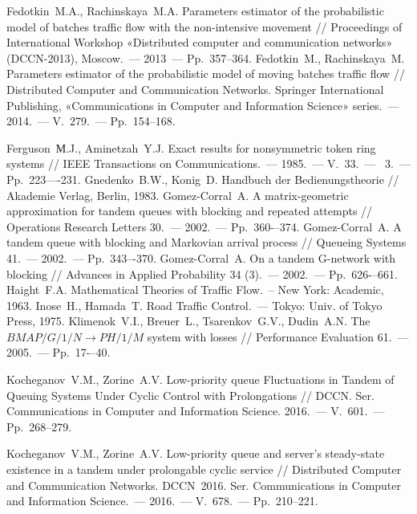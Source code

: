 \documentclass{report}
\newcommand{\No}{\textnumero}
\begin{document}
\begin{thebibliography}{99}
 Fedotkin~M.A., Rachinskaya~M.A. Parameters estimator of the probabilistic model of batches traffic flow with the non-intensive movement // Proceedings of International Workshop «Distributed computer and communication networks» (DCCN-2013), Moscow.~--- 2013~--- Pp.~357--364.
 Fedotkin~M., Rachinskaya~M. Parameters estimator of the probabilistic model of moving batches traffic flow // Distributed Computer and Communication Networks. Springer International Publishing, «Communications in Computer and Information Science» series.~--- 2014.~--- V.~279.~--- Pp.~154--168.

 Ferguson~М.J., Aminetzah~Y.J. Exact results for nonsymmetric token ring systems // IEEE Transactions on Communications.~--- 1985.~--- V.~33.~--- \No{}~3.~--- Pp.~223—-231.
 Gnedenko~B.W., Konig~D. Handbuch der Bedienungstheorie // Akademie Verlag, Berlin, 1983.
 Gomez-Corral~A. A matrix-geometric approximation for tandem queues with blocking and repeated attempts // Operations Research Letters  30.~--- 2002.~--- Pp.~360-–374.
 Gomez-Corral~A. A tandem queue with blocking and Markovian arrival process // Queueing Systems 41.~--- 2002.~--- Pp.~343–-370. 
 Gomez-Corral~A. On a tandem G-network with blocking // Advances in Applied Probability 34 (3).~--- 2002.~--- Pp.~626-–661.
 Haight~F.A. Mathematical Theories of Traffic Flow.~-- New York: Academic, 1963. 
 Inose~H., Hamada~T. Road Traffic Control.~--- Tokyo: Univ. of Tokyo Press, 1975.
 Klimenok~V.I., Breuer~L., Tsarenkov~G.V., Dudin~A.N. The $BMAP/G/1/N \to PH/1/M$ system with losses // Performance Evaluation 61.~--- 2005.~--- Pp.~17-–40.



 Kocheganov~V.M., Zorine~A.V. Low-priority queue Fluctuations in Tandem of Queuing Systems Under Cyclic Control with Prolongations // DCCN. Ser. Communications in Computer and Information Science. 2016.~--- V.~601.~--- Pp.~268--279.

  Kocheganov~V.M., Zorine~A.V. Low-priority queue and server's steady-state existence in a tandem under prolongable cyclic service // Distributed Computer and Communication Networks. DCCN~2016. Ser. Communications in Computer and Information Science.~--- 2016.~--- V.~678.~--- Pp.~210--221.
 

\end{thebibliography}
\end{document}
